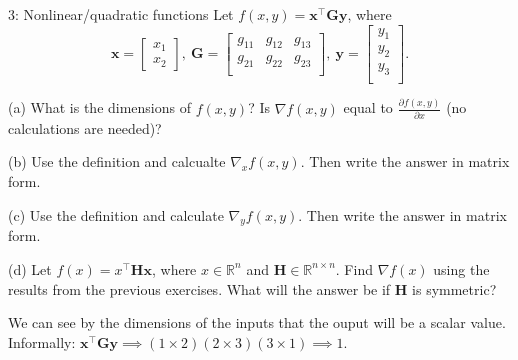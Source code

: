 

\begin{problem}{3: Nonlinear/quadratic functions}
Let $f(x,y)=\mathbf{x^{\top}Gy}$, where
\[
  \mathbf{x} = \begin{bmatrix}
    x_1 \\ x_2
  \end{bmatrix}
  ,\
  \mathbf{G} = \begin{bmatrix}
    g_{11} & g_{12} & g_{13} \\
    g_{21} & g_{22} & g_{23} \\
  \end{bmatrix}
  ,\
  \mathbf{y} = \begin{bmatrix}
    y_1 \\ y_2 \\ y_3\\
  \end{bmatrix}
  .\]

(a) What is the dimensions of $f(x,y)$? Is $\nabla f(x,y)$ equal to $\frac{\partial f(x,y)}{\partial x}$ (no calculations are needed)?

\medskip


(b)
Use the definition and calcualte $\nabla_x f(x,y)$. Then write the answer in matrix form.

\medskip

(c) Use the definition and calculate $\nabla_y f(x,y)$. Then write the answer in matrix form.

\medskip

(d) Let $f(x) = x^{\top}\mathbf{Hx}$, where $x \in \mathbb{R}^{n}$ and $\mathbf{H} \in \mathbb{R}^{n \times n}$. Find $\nabla f(x)$ using the results from
the previous exercises. What will the answer be if $\mathbf{H}$ is symmetric?
\end{problem}



We can see by the dimensions of the inputs that the ouput will be a scalar value.
Informally: $\mathbf{x}^{\top} \mathbf{G} \mathbf{y} \implies (1\times 2)(2\times 3)(3 \times 1) \implies 1$.

\SUBTASK{b}

